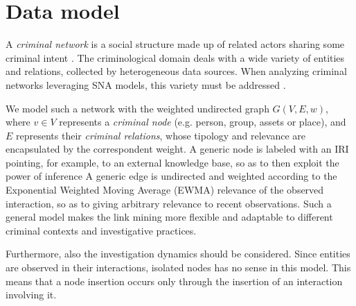 \section{Data model}
\label{sec:data-model}

A \textit{criminal network} is a social structure made up of related actors sharing some criminal intent \cite{von2001organisierte}. 
The criminological domain deals with a wide variety of entities and relations, collected by heterogeneous data sources. 
When analyzing criminal networks leveraging SNA models, this variety must be addressed \cite{pramanik2016framework}.

We model such a network with the weighted undirected graph $G(V,E,w)$, where $v\in V$ represents a \textit{criminal node} (e.g. person, group, assets or place), and $E$ represents their \textit{criminal relations}, whose tipology and relevance are encapsulated by the correspondent weight.
A generic node is labeled with an IRI pointing, for example, to an external knowledge base, so as to then exploit the power of inference
A generic edge is undirected and weighted according to the Exponential Weighted Moving Average (EWMA) relevance of the observed interaction, so as to giving arbitrary relevance to recent observations.  
Such a general model makes the link mining more flexible and adaptable to different criminal contexts and investigative practices.

Furthermore, also the investigation dynamics should be considered. Since entities are observed in their interactions, isolated nodes has no sense in this model. This means that a node insertion occurs only through the insertion of an interaction involving it.

